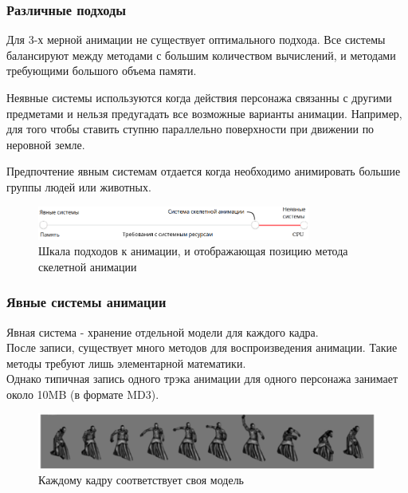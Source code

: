 \documentclass{beamer}
\begin{document}
\begin{frame}
\frametitle{Различные подходы}
\begin{small}
    Для 3-х мерной анимации не существует оптимального подхода. Все системы балансируют между методами с большим количеством вычислений, и методами требующими большого объема памяти.
    
    \medskip
    \alert{Неявные системы} используются когда действия персонажа связанны с другими предметами и нельзя предугадать все возможные варианты анимации. Например, для того чтобы ставить ступню параллельно поверхности при движении по неровной земле.
    
    \smallskip
    Предпочтение \alert{явным системам} отдается когда необходимо анимировать большие группы людей или животных.
    
\begin{figure}[h!]
    \centering
    \includegraphics[width=0.8\textwidth]{raw_graph_cpu_vs_ram.png}
    \caption{Шкала подходов к анимации, и отображающая позицию метода скелетной анимации}
\end{figure}

\end{small}
\end{frame}



\begin{frame}
\frametitle{Явные системы анимации}
\begin{scriptsize}
    Явная система - хранение отдельной модели для каждого кадра. \\
    После записи, существует много методов для воспроизведения анимации. 
    Такие методы требуют лишь элементарной математики. \\
    Однако типичная запись одного трэка анимации для одного персонажа занимает около 10MB (в формате MD3).
   
\begin{figure}[h!]
    \centering
    \includegraphics[width=1\textwidth]{explicit_animation.png}
    \caption{Каждому кадру соответствует своя модель}
\end{figure}

\end{scriptsize}
\end{frame}
\end{document}
